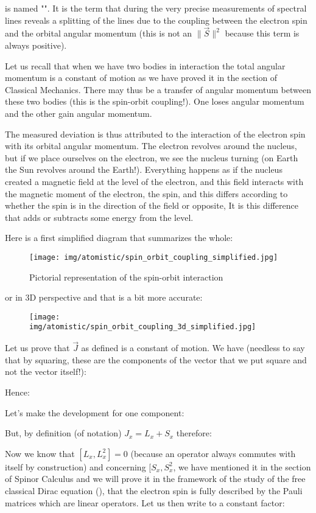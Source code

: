 	is named "". It is the term that during the very precise measurements of spectral lines reveals a splitting of the lines due to the coupling between the electron spin and the orbital angular momentum (this is not an $\|\vec{S}\|^2$ because this term is always positive).
	\begin{tcolorbox}[title=Remark,colframe=black,arc=10pt]
	Let us recall that when we have two bodies in interaction the total angular momentum is a constant of motion as we have proved it in the section of Classical Mechanics. There may thus be a transfer of angular momentum between these two bodies (this is the spin-orbit coupling!). One loses angular momentum and the other gain angular momentum.
	\end{tcolorbox}
	The measured deviation is thus attributed to the interaction of the electron spin with its orbital angular momentum. The electron revolves around the nucleus, but if we place ourselves on the electron, we see the nucleus turning (on Earth the Sun revolves around the Earth!). Everything happens as if the nucleus created a magnetic field at the level of the electron, and this field interacts with the magnetic moment of the electron, the spin, and this differs according to whether the spin is in the direction of the field or opposite, It is this difference that adds or subtracts some energy from the level.
	
	Here is a first simplified diagram that summarizes the whole:
	\begin{figure}[H]
		\centering
		\texttt{[image: img/atomistic/spin\_orbit\_coupling\_simplified.jpg]}	
		\caption{Pictorial representation of the spin-orbit interaction}
	\end{figure}
	or in $3$D perspective and that is a bit more accurate:
	\begin{figure}[H]
		\centering
		\texttt{[image: img/atomistic/spin\_orbit\_coupling\_3d\_simplified.jpg]}
	\end{figure}
	Let us prove that $\vec{J}$ as defined is a constant of motion. We have (needless to say that by squaring, these are the components of the vector that we put square and not the vector itself!):
	
	Hence:
	
	Let's make the development for one  component:
	
	But, by definition (of notation) $J_x=L_x+S_x$ therefore:
	
	Now we know that $[L_x,L_x^2]=0$ (because an operator always commutes with itself by construction) and concerning $[S_x,S_x^2$, we have mentioned it in the section of Spinor Calculus and we will prove it in the framework of the study of the free classical Dirac equation (), that the electron spin is fully described by the Pauli matrices which are linear operators. Let us then write to a constant factor:
	
